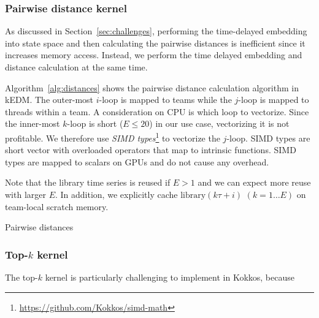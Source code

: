 \documentclass[conference]{IEEEtran}
\begin{document}
\cite{Johnson2019}
\cite{Shanbhag2018}

\subsubsection{Pairwise distance kernel}
As discussed in Section~\ref{sec:challenges}, performing the time-delayed
embedding into state space and then calculating the pairwise distances is
inefficient since it increases memory access. Instead, we perform the time
delayed embedding and distance calculation at the same time.

Algorithm~\ref{alg:distances} shows the pairwise distance calculation
algorithm in kEDM\@. The outer-most $i$-loop is mapped to teams while the
$j$-loop is mapped to threads within a team. A consideration on CPU is which
loop to vectorize. Since the inner-most $k$-loop is short ($E \leq 20$) in our
use case, vectorizing it is not profitable. We therefore use \textit{SIMD
types}\footnote{\url{https://github.com/Kokkos/simd-math}} to vectorize the
$j$-loop. SIMD types are short vector with overloaded operators that map to
intrinsic functions. SIMD types are mapped to scalars on GPUs and do not cause
any overhead.

Note that the library time series is reused if $E > 1$ and we can expect
more reuse with larger $E$. In addition, we explicitly cache $\mathrm{library}
(k \tau + i)$ $(k=1 \dots E)$ on team-local scratch memory.

\begin{algorithm}
    \SetAlgoLined
    \DontPrintSemicolon
    \caption{Pairwise distances}%
    \label{alg:distances}
\end{algorithm}

\subsubsection{Top-$k$ kernel}

The top-$k$ kernel is particularly challenging to implement in Kokkos, because
\end{document}
